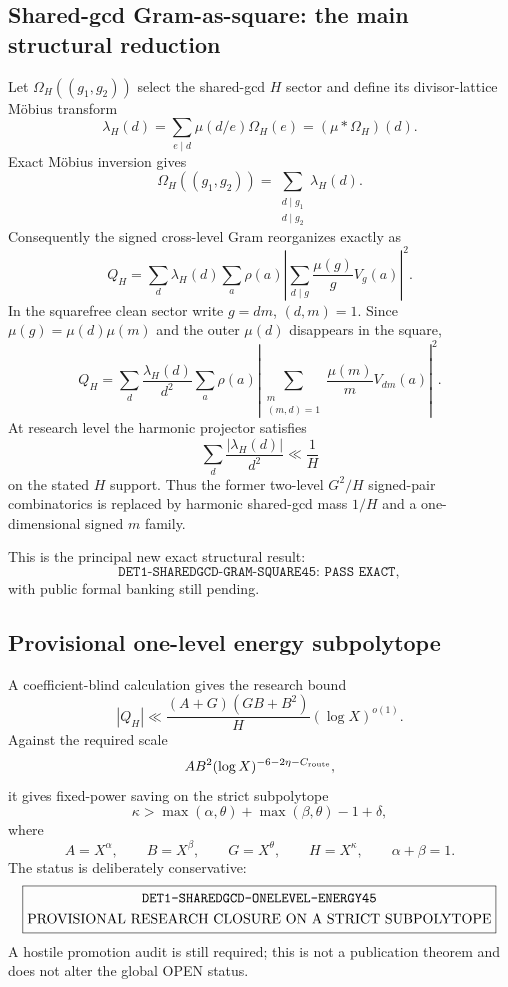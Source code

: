 \documentclass[11pt]{article}
\theoremstyle{definition}
\newcommand{\1}{\mathbf 1}
\begin{document}
\subsection{Shared-gcd Gram-as-square: the main structural reduction}

Let $\Omega_H((g_1,g_2))$ select the shared-gcd $H$ sector and define its divisor-lattice
M\"obius transform
\[
\boxed{
\lambda_H(d)
=
\sum_{e\mid d}\mu(d/e)\Omega_H(e)
=
(\mu*\Omega_H)(d).
}
\]
Exact M\"obius inversion gives
\[
\Omega_H((g_1,g_2))
=
\sum_{\substack{d\mid g_1\\d\mid g_2}}\lambda_H(d).
\]
Consequently the signed cross-level Gram reorganizes exactly as
\[
Q_H=
\sum_d\lambda_H(d)
\sum_a\rho(a)
\left|
\sum_{d\mid g}\frac{\mu(g)}gV_g(a)
\right|^2.
\]
In the squarefree clean sector write $g=dm$, $(d,m)=1$.  Since
$\mu(g)=\mu(d)\mu(m)$ and the outer $\mu(d)$ disappears in the square,
\[
\boxed{
Q_H=
\sum_d\frac{\lambda_H(d)}{d^2}
\sum_a\rho(a)
\left|
\sum_{\substack{m\\(m,d)=1}}
\frac{\mu(m)}mV_{dm}(a)
\right|^2.
}
\]
At research level the harmonic projector satisfies
\[
\sum_d\frac{|\lambda_H(d)|}{d^2}\ll\frac1H
\]
on the stated $H$ support.  Thus the former two-level $G^2/H$ signed-pair combinatorics is
replaced by harmonic shared-gcd mass $1/H$ and a one-dimensional signed $m$ family.

This is the principal new exact structural result:
\[
\boxed{\texttt{DET1-SHAREDGCD-GRAM-SQUARE45: PASS EXACT}},
\]
with public formal banking still pending.

\subsection{Provisional one-level energy subpolytope}

A coefficient-blind calculation gives the research bound
\[
|Q_H|
\ll
\frac{(A+G)(GB+B^2)}{H}(\log X)^{o(1)}.
\]
Against the required scale
\[
AB^2(\log X)^{-6-2\eta-C_{\rm route}},
\]
it gives fixed-power saving on the strict subpolytope
\[
\boxed{
\kappa>
\max(\alpha,\theta)+\max(\beta,\theta)-1+\delta,
}
\]
where
\[
A=X^\alpha,\qquad B=X^\beta,\qquad G=X^\theta,\qquad H=X^\kappa,
\qquad \alpha+\beta=1.
\]
The status is deliberately conservative:
\[
\boxed{\begin{gathered}
\texttt{DET1-SHAREDGCD-ONELEVEL-ENERGY45}\\
\text{\rm PROVISIONAL RESEARCH CLOSURE ON A STRICT SUBPOLYTOPE}
\end{gathered}}
\]
A hostile promotion audit is still required; this is not a publication theorem and does
not alter the global OPEN status.
\end{document}
